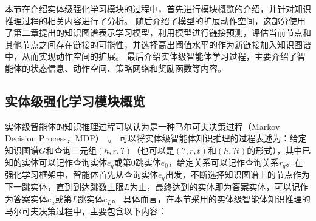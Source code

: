 \documentclass[algorithmlist, AutoFakeBold, AutoFakeSlant, figurelist, tablelist, nomlist, masters]{seuthesix}
\begin{document}
本节在介绍实体级强化学习模块的过程中，首先进行模块概览的介绍，并针对知识推理过程的相关内容进行了分析。
随后介绍了模型的扩展动作空间，这部分使用了第二章提出的知识图谱表示学习模型，利用模型进行链接预测，评估当前节点和其他节点之间存在链接的可能性，并选择高出阈值水平的作为新链接加入知识图谱中，从而实现动作空间的扩展。
最后介绍实体级智能体学习过程，主要介绍了智能体的状态信息、动作空间、策略网络和奖励函数等内容。

\subsection{实体级强化学习模块概览}
实体级智能体的知识推理过程可以认为是一种马尔可夫决策过程（Markov Decision Process，MDP）~\cite{gronauer2022multi}。
可以将实体级智能体知识推理的过程表述为：给定知识图谱$G$和查询三元组$(h, r, ?)$（也可以是$(?, r, t)$和$(h, ? t)$的形式），其中已知的实体可以记作查询实体$e_q$或第0跳实体$e_0$，给定关系可以记作查询关系$r_q$。在强化学习框架中，智能体首先从查询实体$e_q$出发，不断选择知识图谱上的节点作为下一跳实体，直到到达跳数上限$L$为止，最终达到的实体即为答案实体，可以记作为答案实体$e_a$或第$L$跳实体$e_L$。
具体而言，在本节采用的实体级智能体知识推理的马尔可夫决策过程中，主要包含以下内容：
\end{document}
